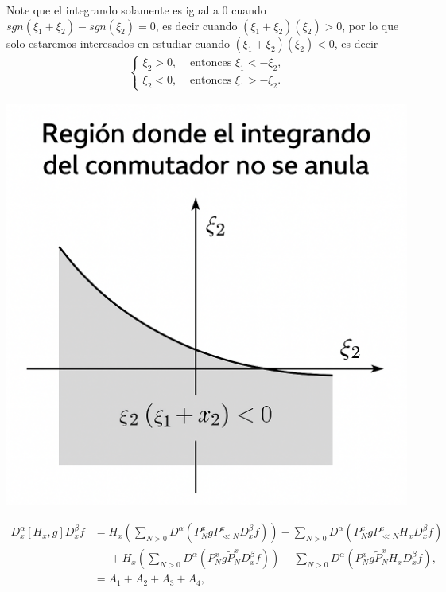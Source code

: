 \documentclass[9pt]{beamer}
\begin{document}
\begin{frame}{}
  Note que el integrando solamente es igual a $0$ cuando $sgn(\xi_{1}+\xi_{2})-sgn(\xi_{2})=0$, es decir cuando $(\xi_{1}+\xi_{2})(\xi_{2})>0$, por lo que solo estaremos interesados en estudiar cuando $(\xi_{1}+\xi_{2})(\xi_{2})<0$, es decir
  \begin{align*}
    \begin{cases}
      \xi_{2}>0, &\text{ entonces } \xi_{1}<-\xi_{2} \text{,} \\
      \xi_{2}<0, &\text{ entonces } \xi_{1}>-\xi_{2}.
    \end{cases}
  \end{align*}
  \begin{center}
    \includegraphics[scale=0.15]{Diagrama de conmutador en 2D.png}
  \end{center}
\end{frame}

\begin{frame}{}
  \begin{align*}
    D_x^\alpha [H_x, g] D_x^\beta f &=H_{x}\left( \sum_{N>0}D^{\alpha}(P_{N}^{x}gP_{\ll N}^{x}D_{x}^{\beta}f) \right)-\sum_{N>0}D^{\alpha}(P_{N}^{x}gP_{\ll N}^{x}H_{x}D_{x}^{\beta}f)\\
    &\phantom{=}+H_{x}\left(\sum_{N>0}D^{\alpha}(P_{N}^{x}g\tilde{P}_{N}^{x}D_{x}^{\beta}f) \right)-\sum_{N>0}D^{\alpha}(P_{N}^{x}g\tilde{P}_{N}^{x}H_{x}D_{x}^{\beta}f),\\
    &= A_1 + A_2 + A_3 + A_4, 
  \end{align*}
\end{frame}
\end{document}
